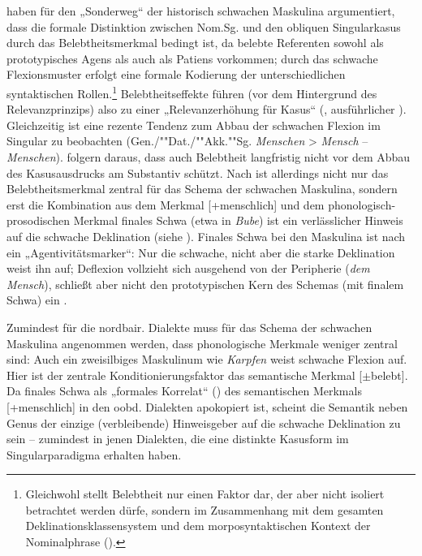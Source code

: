 \citet{DammelGillmann2014} haben für den „Sonderweg“ der historisch schwachen Maskulina argumentiert, dass die formale Distinktion zwischen Nom.Sg. und den obliquen Singularkasus durch das Belebtheitsmerkmal bedingt ist, da belebte Referenten sowohl als prototypisches Agens als auch als Patiens vorkommen; durch das schwache Flexionsmuster erfolgt eine formale Kodierung der unterschiedlichen syntaktischen Rollen.\footnote{Gleichwohl stellt Belebtheit nur einen Faktor dar, der aber nicht isoliert betrachtet werden dürfe, sondern im Zusammenhang mit dem gesamten Deklinationsklassensystem und dem morposyntaktischen Kontext der Nominalphrase (\citealt[212]{DammelGillmann2014}).} Belebtheitseffekte führen (vor dem Hintergrund des Relevanzprinzips) also zu einer „Relevanzerhöhung für Kasus“ (\citealt[211]{DammelGillmann2014}, ausführlicher ). Gleichzeitig ist eine rezente Tendenz zum Abbau der schwachen Flexion im Singular zu beobachten (Gen./""Dat./""Akk.""Sg. \textit{Menschen} > \textit{Mensch} -- \textit{Menschen}). \citet[212]{DammelGillmann2014} folgern daraus, dass auch Belebtheit langfristig nicht vor dem Abbau des Kasusausdrucks am Substantiv schützt. Nach \citet{Köpcke2000a, Köpcke2002} ist allerdings nicht nur das Belebtheitsmerkmal zentral für das Schema der schwachen Maskulina, sondern erst die Kombination aus dem Merkmal [+menschlich] und dem phonologisch-prosodischen Merkmal finales Schwa (etwa in \textit{Bube}) ist ein verlässlicher Hinweis auf die schwache Deklination (siehe ). Finales Schwa bei den Maskulina ist nach \citet[119]{Köpcke2000a} ein „Agentivitätsmarker“: Nur die schwache, nicht aber die starke Deklination weist ihn auf; Deflexion vollzieht sich ausgehend von der Peripherie (\textit{dem Mensch}), schließt aber nicht den prototypischen Kern des Schemas (mit finalem Schwa) ein \citep[105]{Köpcke2002}.

Zumindest für die nordbair. Dialekte muss für das Schema der schwachen Maskulina angenommen werden, dass phonologische Merkmale weniger zentral sind: Auch ein zweisilbiges Maskulinum wie \textit{Karpfen} weist schwache Flexion auf. Hier ist der zentrale Konditionierungsfaktor das semantische Merkmal [${\pm}$belebt]. Da finales Schwa als „formales Korrelat“ (\citealt[119]{Köpcke2000a}) des semantischen Merkmals [+menschlich] in den oobd. Dialekten apokopiert ist, scheint die Semantik neben Genus der einzige (verbleibende) Hinweisgeber auf die schwache Deklination zu sein -- zumindest in jenen Dialekten, die eine distinkte Kasusform im Singularparadigma erhalten haben.


